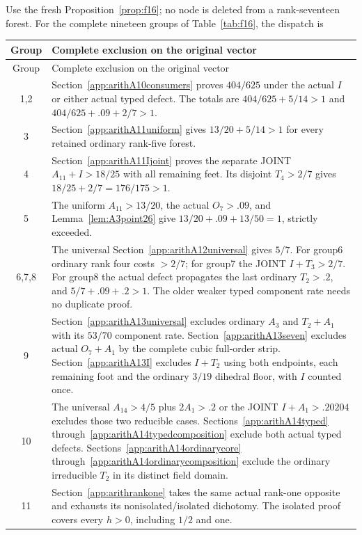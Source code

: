 \documentclass[11pt]{article}
\begin{document}
Use the fresh
Proposition~\ref{prop:f16};
no node is deleted from a
rank-seventeen forest.
For the complete nineteen groups
of Table~\ref{tab:f16}, the dispatch is
\begin{longtable}{cp{10.3cm}}
\toprule Group&Complete exclusion on the original vector\\\midrule\endfirsthead
\toprule Group&Complete exclusion on the original vector\\\midrule\endhead
1,2&Section~\ref{app:arithA10consumers}
proves \(404/625\) under the actual
\(I\) or either actual typed defect.
The totals are \(404/625+5/14>1\)
and \(404/625+.09+2/7>1\).\\
3&Section~\ref{app:arithA11uniform}
gives \(13/20+5/14>1\) for every
retained ordinary rank-five forest.\\
4&Section~\ref{app:arithA11Ijoint}
proves the separate JOINT
\(A_{11}+I>18/25\) with all remaining
feet. Its disjoint \(T_4>2/7\)
gives \(18/25+2/7=176/175>1\).\\
5&The uniform \(A_{11}>13/20\),
the actual \(O_7>.09\), and
Lemma~\ref{lem:A3point26}
give \(13/20+.09+13/50=1\),
strictly exceeded.\\
6,7,8&The universal
Section~\ref{app:arithA12universal}
gives \(5/7\).
For group6 ordinary rank four
costs \(>2/7\); for group7 the
JOINT \(I+T_3>2/7\).
For group8 the actual defect
propagates the last ordinary
\(T_2>.2\), and
\(5/7+.09+.2>1\).
The older weaker typed component
rate needs no duplicate proof.\\
9&Section~\ref{app:arithA13universal}
excludes ordinary \(A_3\) and
\(T_2+A_1\) with its \(53/70\)
component rate.
Section~\ref{app:arithA13seven}
excludes actual \(O_7+A_1\) by
the complete cubic full-order strip.
Section~\ref{app:arithA13I}
excludes \(I+T_2\) using both
endpoints, each remaining foot
and the ordinary \(3/19\) dihedral
floor, with \(I\) counted once.\\
10&The universal \(A_{14}>4/5\)
plus \(2A_1>.2\) or the JOINT
\(I+A_1>.20204\) excludes those
two reducible cases.
Sections~\ref{app:arithA14typed}
through~\ref{app:arithA14typedcomposition}
exclude both actual typed defects.
Sections~\ref{app:arithA14ordinarycore}
through~\ref{app:arithA14ordinarycomposition}
exclude the ordinary irreducible
\(T_2\) in its distinct field domain.\\
11&Section~\ref{app:arithrankone}
takes the same actual rank-one
opposite and exhausts its
nonisolated/isolated dichotomy.
The isolated proof covers every
\(h>0\), including \(1/2\) and one.\\

\end{longtable}
\end{document}

